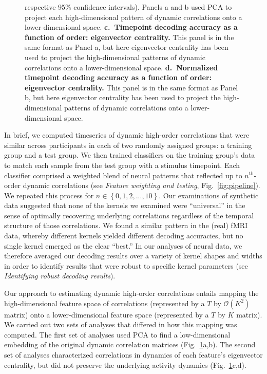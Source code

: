 \documentclass[english]{article}
\begin{document}
\begin{figure}[tp]
{    respective 95\% confidence intervals).  Panels a and b used PCA to
    project each high-dimensional pattern of dynamic correlations onto
    a lower-dimensional space.  \textbf{c.~Timepoint decoding accuracy as a
      function of order: eigenvector centrality.} This panel is in the
    same format as Panel a, but here eigenvector centrality has been
    used to project the high-dimensional patterns of dynamic
    correlations onto a lower-dimensional space.
    \textbf{d.~Normalized timepoint decoding accuracy as a function of order:
      eigenvector centrality.} This panel is in the same format as
    Panel b, but here eigenvector centrality has been used to project
    the high-dimensional patterns of dynamic correlations onto a
    lower-dimensional space.}
  \label{fig:decoding}
\end{figure}

In brief, we computed timeseries of dynamic high-order correlations
that were similar across participants in each of two randomly assigned
groups: a training group and a test group.  We then trained
classifiers on the training group's data to match each sample from the
test group with a stimulus timepoint.  Each classifier comprised a
weighted blend of neural patterns that reflected up to
$n^\mathrm{th}$-order dynamic correlations (see \textit{Feature
  weighting and testing}, Fig.~\ref{fig:pipeline}).  We repeated this process for
$n \in \left\{ 0, 1, 2, ..., 10 \right\}$.  Our examinations of
synthetic data suggested that none of the kernels we examined were
``universal'' in the sense of optimally recovering underlying
correlations regardless of the temporal structure of those
correlations.  We found a similar pattern in the (real) fMRI data,
whereby different kernels yielded different decoding accuracies, but
no single kernel emerged as the clear ``best.''  In our analyses of
neural data, we therefore averaged our decoding results over a variety
of kernel shapes and widths in order to identify results that were
robust to specific kernel parameters (see \textit{Identifying robust
  decoding results}).

Our approach to estimating dynamic high-order correlations entails
mapping the high-dimensional feature space of correlations
(represented by a $T$ by
$\mathcal{O}(K^2)$ matrix) onto a lower-dimensional feature space
(represented by a $T$ by $K$ matrix).
We carried out two sets of analyses that differed in how this mapping
was computed.  The first set of analyses used PCA to find a
low-dimensional embedding of the original dynamic correlation matrices
(Fig.~\ref{fig:decoding}a,b).  The second set of analyses
characterized correlations in dynamics of each feature's eigenvector
centrality, but did not preserve the underlying activity dynamics
(Fig.~\ref{fig:decoding}c,d).
\end{document}
